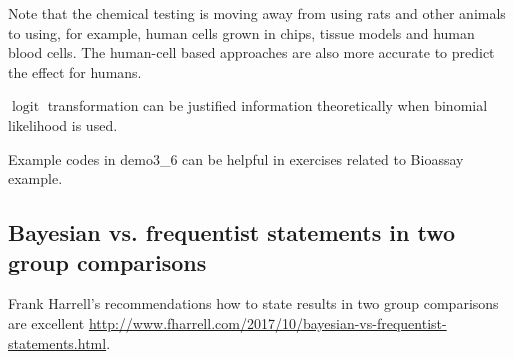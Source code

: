 \documentclass[a4paper,11pt,english]{article}
\DeclareMathOperator{\logit}{logit}
\begin{document}
Note that the chemical testing is moving away from using rats and
other animals to using, for example, human cells grown in chips,
tissue models and human blood cells. The human-cell based approaches
are also more accurate to predict the effect for humans.

$\logit$ transformation can be justified information theoretically
when binomial likelihood is used.

Example codes in demo3\_6 can be helpful in exercises related to
Bioassay example.

\subsection*{Bayesian vs. frequentist statements in two group comparisons}

Frank Harrell's recommendations how to state results in two group
comparisons are excellent
\url{http://www.fharrell.com/2017/10/bayesian-vs-frequentist-statements.html}.
\end{document}
